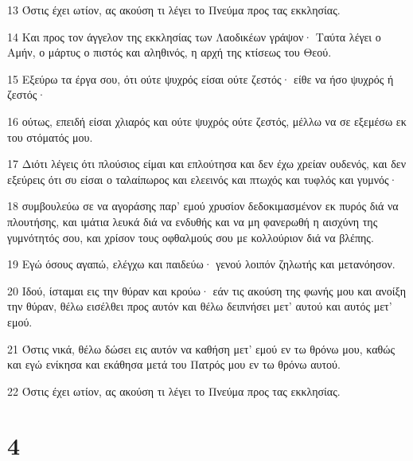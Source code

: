 \par 13 Όστις έχει ωτίον, ας ακούση τι λέγει το Πνεύμα προς τας εκκλησίας.
\par 14 Και προς τον άγγελον της εκκλησίας των Λαοδικέων γράψον· Ταύτα λέγει ο Αμήν, ο μάρτυς ο πιστός και αληθινός, η αρχή της κτίσεως του Θεού.
\par 15 Εξεύρω τα έργα σου, ότι ούτε ψυχρός είσαι ούτε ζεστός· είθε να ήσο ψυχρός ή ζεστός·
\par 16 ούτως, επειδή είσαι χλιαρός και ούτε ψυχρός ούτε ζεστός, μέλλω να σε εξεμέσω εκ του στόματός μου.
\par 17 Διότι λέγεις ότι πλούσιος είμαι και επλούτησα και δεν έχω χρείαν ουδενός, και δεν εξεύρεις ότι συ είσαι ο ταλαίπωρος και ελεεινός και πτωχός και τυφλός και γυμνός·
\par 18 συμβουλεύω σε να αγοράσης παρ' εμού χρυσίον δεδοκιμασμένον εκ πυρός διά να πλουτήσης, και ιμάτια λευκά διά να ενδυθής και να μη φανερωθή η αισχύνη της γυμνότητός σου, και χρίσον τους οφθαλμούς σου με κολλούριον διά να βλέπης.
\par 19 Εγώ όσους αγαπώ, ελέγχω και παιδεύω· γενού λοιπόν ζηλωτής και μετανόησον.
\par 20 Ιδού, ίσταμαι εις την θύραν και κρούω· εάν τις ακούση της φωνής μου και ανοίξη την θύραν, θέλω εισέλθει προς αυτόν και θέλω δειπνήσει μετ' αυτού και αυτός μετ' εμού.
\par 21 Όστις νικά, θέλω δώσει εις αυτόν να καθήση μετ' εμού εν τω θρόνω μου, καθώς και εγώ ενίκησα και εκάθησα μετά του Πατρός μου εν τω θρόνω αυτού.
\par 22 Όστις έχει ωτίον, ας ακούση τι λέγει το Πνεύμα προς τας εκκλησίας.

\chapter{4}


